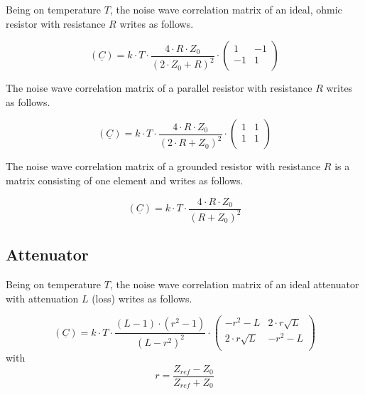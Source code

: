 \documentclass[10pt]{report}
\begin{document}
Being on temperature $T$, the noise wave correlation matrix of an
ideal, ohmic resistor with resistance $R$ writes as follows.

\begin{equation}
(\underline{C}) = k\cdot T\cdot\frac{4\cdot R\cdot Z_0}{(2\cdot Z_0+R)^2}\cdot
\begin{pmatrix}
   1 & -1\\
  -1 &  1\\
\end{pmatrix}
\end{equation}

The noise wave correlation matrix of a parallel resistor with resistance $R$
writes as follows.

\begin{equation}
(\underline{C}) = k\cdot T\cdot\frac{4\cdot R\cdot Z_0}{(2\cdot R+Z_0)^2}\cdot
\begin{pmatrix}
  1 & 1\\
  1 & 1\\
\end{pmatrix}
\end{equation}

The noise wave correlation matrix of a grounded resistor with resistance $R$
is a matrix consisting of one element and writes as follows.

\begin{equation}
(\underline{C}) = k\cdot T\cdot\frac{4\cdot R\cdot Z_0}{(R+Z_0)^2}
\end{equation}


\subsection{Attenuator}

Being on temperature $T$, the noise wave correlation matrix of an
ideal attenuator with attenuation $L$ (loss) writes as follows.

\begin{equation}
(\underline{C}) = k\cdot T\cdot\frac{(L-1)\cdot(r^2-1)}{(L-r^2)^2}\cdot
\begin{pmatrix}
  -r^2-L           & 2\cdot r\sqrt{L}\\
  2\cdot r\sqrt{L} & -r^2-L\\
\end{pmatrix}
\end{equation}
with
\begin{equation}
r=\frac{Z_{ref}-Z_0}{Z_{ref}+Z_0}
\end{equation}
\end{document}
